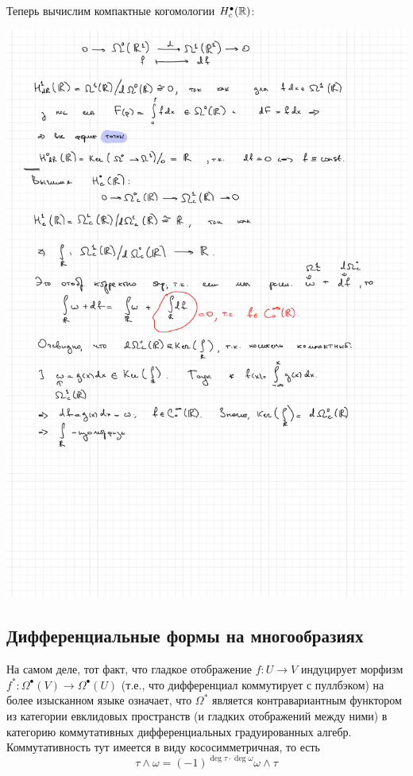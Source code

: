 \begin{example}
		Теперь вычислим компактные когомологии $H^{\bullet}_{c}(\mathbb{R})$:
		\begin{center}
			\includegraphics[scale = 0.6]{lectures/7/pictures/line_de_Rham_2.pdf}
		\end{center}

	\end{example}

	\subsection{Дифференциальные формы на многообразиях}

	На самом деле, тот факт, что гладкое отображение $f\colon U \to V$ индуцирует морфизм $f^* \colon \Omega^{\bullet}(V) \to \Omega^{\bullet}(U)$ (т.е., что дифференциал коммутирует с пуллбэком) на более изысканном языке означает, что $\Omega^*$ является контравариантным функтором из категории евклидовых пространств (и гладких отображений между ними) в категорию коммутативных дифференциальных градуированных алгебр. Коммутативность тут имеется в виду кососимметричная, то есть
	\[
		\tau \wedge \omega = (-1)^{\deg{\tau} \cdot \deg{\omega}} \omega \wedge \tau
	\]


